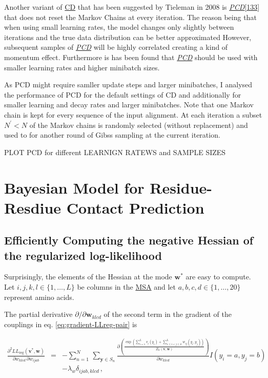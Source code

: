 \documentclass[12pt,a4paper,twoside]{book}
\newcommand{\eq}{\!=\!}
\newcommand{\LLreg}{L\!L_\mathrm{reg}}
\newcommand{\Sn}{S_n}
\renewcommand{\v}{\mathbf{v}}
\newcommand{\w}{\mathbf{w}}
\newcommand{\wijab}{w_{ijab}}
\newcommand{\wklcd}{w_{klcd}}
\theoremstyle{definition}
\theoremstyle{definition}
\theoremstyle{remark}
\begin{document}
Another variant of \protect\hyperlink{abbrev}{CD} that has been
suggested by Tieleman in 2008 is
\protect\hyperlink{abbrev}{\emph{PCD}}{[}\protect\hyperlink{ref-Tieleman2008}{133}{]}
that does not reset the Markov Chains at every iteration. The reason
being that when using small learning rates, the model changes only
slightly between iterations and the true data distribution can be better
approximated However, subsequent samples of
\protect\hyperlink{abbrev}{\emph{PCD}} will be highly correlated
creating a kind of momentum effect. Furthermore is has been found that
\protect\hyperlink{abbrev}{\emph{PCD}} should be used with smaller
learning rates and higher minibatch sizes.

As PCD might require samller update steps and larger minibatches, I
analysed the performance of PCD for the default settings of CD and
additionally for smaller learning and decay rates and larger
minibatches. Note that one Markov chain is kept for every sequence of
the input alignment. At each iteration a subset \(N^{\prime} < N\) of
the Markov chains is randomly selected (without replacement) and used to
for another round of Gibss sampling at the current iteration.

PLOT PCD for different LEARNIGN RATEWS and SAMPLE SIZES

\section{Bayesian Model for Residue-Resdiue Contact
Prediction}\label{bayesian-model-for-residue-resdiue-contact-prediction}

\subsection{Efficiently Computing the negative Hessian of the
regularized log-likelihood}\label{neg-Hessian-computation}

Surprisingly, the elements of the Hessian at the mode \(\w^*\) are easy
to compute. Let \(i,j,k,l \in \{1,\ldots,L\}\) be columns in the
\protect\hyperlink{abbrev}{MSA} and let
\(a, b, c, d \in \{1,\ldots,20\}\) represent amino acids.

The partial derivative \(\partial / \partial \w_{klcd}\) of the second
term in the gradient of the couplings in eq.
\eqref{eq:gradient-LLreg-pair} is

\begin{eqnarray}
    \frac{\partial^2 \LLreg(\v^*,\w)}{\partial \wklcd \, \partial \wijab } 
    &=&  - \sum_{n=1}^{N} \, \sum_{\mathbf{y} \in \Sn} \frac{\partial \left( \frac{\exp \left( \sum_{i=1}^L v_i(y_i) + \sum_{1 \le i < j \le L}^L w_{ij}(y_i,y_j) \right) }{Z_n(\v,\w)} \right)}{\partial \wklcd}   I(y_i \eq a, y_j \eq b) \\
    &&- \lambda_w \delta_{ijab,klcd} \,,
\end{eqnarray}
\end{document}
